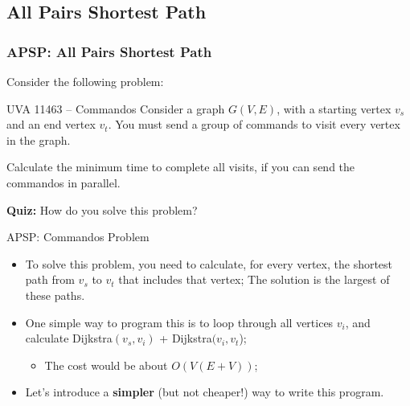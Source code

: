 \subsection{All Pairs Shortest Path}
\begin{frame}
  \frametitle{APSP: All Pairs Shortest Path}

  Consider the following problem:

  \begin{block}{UVA 11463 -- Commandos}
    Consider a graph $G(V,E)$, with a starting vertex $v_s$ and an end vertex $v_t$. You must send a group of commands to visit every vertex in the graph.\bigskip

    Calculate the minimum time to complete all visits, if you can send the commandos in parallel.
  \end{block}

  {\bf Quiz:} How do you solve this problem?
\end{frame}

\begin{frame}{APSP: Commandos Problem}
  \begin{itemize}
  \item To solve this problem, you need to calculate, for every vertex, the shortest path from $v_s$ to $v_t$ that includes that vertex; The solution is the largest of these paths.\bigskip

  \item One simple way to program this is to loop through all vertices $v_i$, and calculate Dijkstra$(v_s,v_i)$ + Dijkstra$(v_i,v_t$);
  \begin{itemize}
    \item The cost would be about $O(V(E+V))$;
  \end{itemize}\bigskip

  \item Let's introduce a {\bf simpler} (but not cheaper!) way to write this program.
  \end{itemize}
\end{frame}

